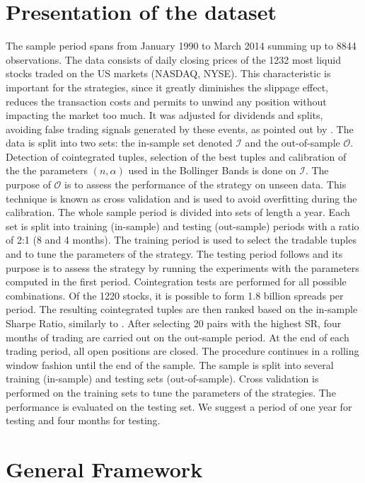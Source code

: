 \documentclass[11pt,a4,twosided,singlespacing,titlepagenumber=on]{scrreprt}
\numberwithin{equation}{chapter} %
\theoremstyle{remark}
\begin{document}
\section{Presentation of the dataset}
The sample period spans from January 1990 to March 2014 summing up to 8844 observations. The data consists of daily closing prices of the 1232 most liquid stocks traded on the US markets (NASDAQ, NYSE). This characteristic is important for the strategies, since it greatly diminishes the slippage effect, reduces the transaction costs and permits to unwind any position without impacting the market too much. It was adjusted for dividends and splits, avoiding false trading signals generated by these events, as pointed out by \cite{broussard2012}. The data is split into two sets: the in-sample set denoted $\mathcal{I}$ and the out-of-sample $\mathcal{O}$. Detection of cointegrated tuples, selection of the best tuples and calibration of the the parameters $(n,\alpha)$ used in the Bollinger Bands is done on $\mathcal{I}$. The purpose of $\mathcal{O}$ is to assess the performance of the strategy on unseen data. This technique is known as cross validation and is used to avoid overfitting during the calibration. The whole sample period is divided into sets of length a year. Each set is split into training (in-sample) and testing (out-sample) periods with a ratio of 2:1 (8 and 4 months). The training period is used to select the tradable tuples and to tune the parameters of the strategy. The testing period follows and its purpose is to assess the strategy by running the experiments with the parameters computed in the first period. Cointegration tests are performed for all possible combinations. Of the 1220 stocks, it is possible to form 1.8 billion spreads per period. The resulting cointegrated tuples are then ranked based on the in-sample Sharpe Ratio, similarly to \cite{gatev2006}. After selecting 20 pairs with the highest SR, four months of trading are carried out on the out-sample period. At the end of each trading period, all open positions are closed. The procedure continues in a rolling window fashion until the end of the sample. The sample is split into several training (in-sample) and testing sets (out-of-sample). Cross validation is performed on the training sets to tune the parameters of the strategies. The performance is evaluated on the testing set. We suggest a period of one year for testing and four months for testing.

\section{General Framework}
\end{document}
